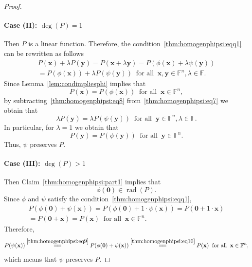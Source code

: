 \documentclass{elsarticle}
\DeclareMathOperator{\rad}{rad}
\def\F{{\mathbb F}}
\theoremstyle{definition}
\numberwithin{equation}{section}
\begin{document}
\begin{proof}
\paragraph{Case (II): $\deg(P) = 1$} Then $P$ is a linear function. Therefore, the condition~\eqref{thm:homogenphipsi:eqq1} can be rewritten as follows
\begin{multline}\label{thm:homogenphipsi:eq7}
P(\mathbf x) + \lambda P(\mathbf y) = P(\mathbf x + \lambda \mathbf y) = P(\phi(\mathbf x) + \lambda \psi(\mathbf y))\\ = P(\phi(\mathbf x)) + \lambda P(\psi(\mathbf y))\;\;\mbox{for all}\;\;\mathbf x, \mathbf y \in \F^n, \lambda \in \F.
\end{multline}
Since Lemma~\ref{lem:condimpliesphi} implies that
\begin{equation}\label{thm:homogenphipsi:eq8}
P(\mathbf x) = P(\phi(\mathbf x))\;\;\mbox{for all}\;\;\mathbf x \in \F^n,
\end{equation}
by subtracting~\eqref{thm:homogenphipsi:eq8} from~\eqref{thm:homogenphipsi:eq7} we obtain that
\begin{equation*}
\lambda P(\mathbf y) = \lambda P(\psi(\mathbf y))\;\;\mbox{for all}\;\;\mathbf y \in \F^n, \lambda \in \F.
\end{equation*}
In particular, for $\lambda = 1$ we obtain that
\begin{equation*}
P(\mathbf y) = P(\psi(\mathbf y))\;\;\mbox{for all}\;\;\mathbf y \in \F^n.
\end{equation*}
Thus, $\psi$ preserves $P$.

\paragraph{Case (III): $\deg(P) > 1$} Then Claim~\ref{thm:homogenphipsi:part1} implies that 
\begin{equation}\label{thm:homogenphipsi:eq9}
\phi(\mathbf 0) \in \rad(P).
\end{equation}
Since $\phi$ and $\psi$ satisfy the condition~\eqref{thm:homogenphipsi:eqq1},
\begin{multline}\label{thm:homogenphipsi:eq10}
 P(\phi(\mathbf 0) + \psi(\mathbf x)) = P(\phi(\mathbf 0) + 1\cdot \psi(\mathbf x)) = P(\mathbf 0 + 1\cdot \mathbf x)\\ = P(\mathbf 0 + \mathbf x) = P(\mathbf x)\;\;\mbox{for all}\;\;\mathbf x \in \F^n.
\end{multline}
Therefore,
\[
P(\psi(\mathbf x)) \overset{\eqref{thm:homogenphipsi:eq9}}{=\joinrel=}  P(\phi(\mathbf 0) + \psi(\mathbf x))\overset{\eqref{thm:homogenphipsi:eq10}}{=\joinrel=} P(\mathbf x)\;\;\mbox{for all}\;\;\mathbf x \in \F^n,
\]
which means that $\psi$ preserves $P$.

\end{proof}
\end{document}
